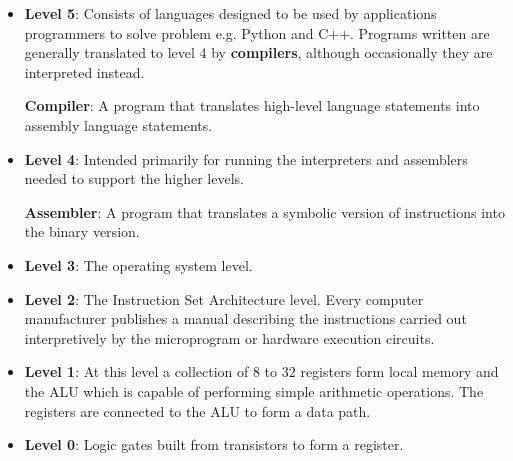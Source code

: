 \documentclass[10pt,a4paper]{article}
\begin{document}
\begin{itemize}
    \item \textbf{Level 5}: Consists of languages designed to be used by applications programmers to
    solve problem e.g. Python and C++. Programs written are generally translated to level 4 by
    \textbf{compilers}, although occasionally they are interpreted instead.
    \begin{tcolorbox}[breakable,colback=white]
    \textbf{Compiler}: A program that translates high-level language statements into assembly
    language statements.
    \end{tcolorbox}
    \item \textbf{Level 4}: Intended primarily for running the interpreters and assemblers needed to support the higher levels.
    \begin{tcolorbox}[breakable,colback=white]
    \textbf{Assembler}:  A program that translates a symbolic version of instructions into the binary version.
    \end{tcolorbox}
    \item \textbf{Level 3}: The operating system level.
    \item \textbf{Level 2}: The Instruction Set Architecture level. Every
    computer manufacturer publishes a manual describing the instructions carried out interpretively
    by the microprogram or hardware execution circuits. 
    \item \textbf{Level 1}: At this level a collection of $8$ to $32$ registers form local memory
    and the ALU which is capable of performing simple arithmetic operations. The registers are
    connected to the ALU to form a data path.
    \item \textbf{Level 0}: Logic gates built from transistors to form a register.
\end{itemize}


\end{document}
